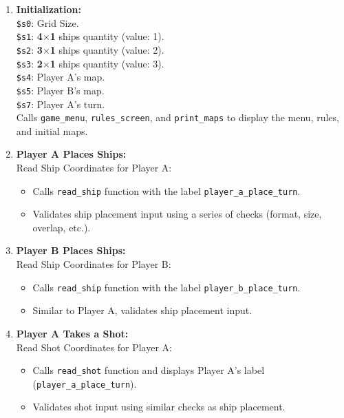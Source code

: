 \begin{enumerate}
    \item \textbf{Initialization:} \\[6pt]
    \texttt{\$s0}: Grid Size. \\
    \texttt{\$s1}: \textbf{4$\times$1} ships quantity (value: 1). \\
    \texttt{\$s2}: \textbf{3$\times$1} ships quantity (value: 2). \\
    \texttt{\$s3}: \textbf{2$\times$1} ships quantity (value: 3). \\
    \texttt{\$s4}: Player A's map. \\
    \texttt{\$s5}: Player B's map. \\
    \texttt{\$s7}: Player A's turn. \\

    Calls \texttt{game\_menu},  \texttt{rules\_screen}, and  \texttt{print\_maps} to display the menu, rules, and initial maps.

    \item \textbf{Player A Places Ships:} \\[6pt]
    Read Ship Coordinates for Player A:
    \begin{itemize}
        \item Calls \texttt{read\_ship} function with the label \texttt{player\_a\_place\_turn}.
        \item Validates ship placement input using a series of checks (format, size, overlap, etc.).
    \end{itemize}

    \item \textbf{Player B Places Ships:} \\[6pt]
    Read Ship Coordinates for Player B:
    \begin{itemize}
        \item Calls \texttt{read\_ship} function with the label 
        \texttt{player\_b\_place\_turn}.
        \item Similar to Player A, validates ship placement input.
    \end{itemize}

    \item \textbf{Player A Takes a Shot:} \\[6pt]
    Read Shot Coordinates for Player A:
    \begin{itemize}
        \item Calls \texttt{read\_shot} function and displays Player A's label (\texttt{player\_a\_place\_turn}).
        \item Validates shot input using similar checks as ship placement.
    \end{itemize}


\end{enumerate}
